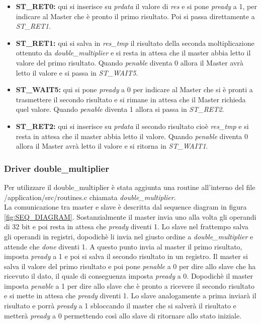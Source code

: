 \documentclass[]{IEEEtran}
\begin{document}
\begin{itemize}
    \item \textbf{ST\_RET0:} qui si inserisce su \textit{prdata} il valore di \textit{res} e si pone \textit{pready} a 1, per indicare al Master che è pronto il primo risultato. Poi si passa direttamente a \textit{ST\_RET1}.
    \item \textbf{ST\_RET1:} qui si salva in \textit{res\_tmp} il risultato della seconda moltiplicazione ottenuto da \textit{double\_multiplier} e si resta in attesa che il master abbia letto il valore del primo risultato. Quando \textit{penable} diventa 0 allora il Master avrà letto il valore e si passa in \textit{ST\_WAIT5}.
    \item \textbf{ST\_WAIT5:} qui si pone \textit{pready} a 0 per indicare al Master che si è pronti a trasmettere il secondo risultato e si rimane in attesa che il Master richieda quel valore. Quando \textit{penable} diventa 1 allora si passa in \textit{ST\_RET2}.
    \item \textbf{ST\_RET2:} qui si inserisce su \textit{prdata} il secondo risultato cioè \textit{res\_tmp} e si resta in attesa che il master abbia letto il valore. Quando \textit{penable} diventa 0 allora il Master avrà letto il valore e si ritorna in \textit{ST\_WAIT1}.
\end{itemize}

\subsubsection{Driver double\_multiplier}
Per utilizzare il double\_multiplier è stata aggiunta una routine all'interno del file /application/src/routines.c chiamata \textit{double\_multiplier}.
\\La comunicazione tra master e slave è descritta dal sequence diagram in figura \ref{fig:SEQ_DIAGRAM}. Sostanzialmente il master invia uno alla volta gli operandi di 32 bit e poi resta in attesa che \textit{pready} diventi 1. Lo slave nel frattempo salva gli operandi in registri, dopodichè li invia nel giusto ordine a \textit{double\_multiplier} e attende che \textit{done} diventi 1. A questo punto invia al master il primo risultato, imposta \textit{pready} a 1 e poi si salva il secondo risultato in un registro. Il master si salva il valore del primo risultato e poi pone \textit{penable} a 0 per dire allo slave che ha ricevuto il dato, il quale di conseguenza imposta \textit{pready} a 0. Dopodichè il master imposta \textit{penable} a 1 per dire allo slave che è pronto a ricevere il secondo risultato e si mette in attesa che \textit{pready} diventi 1. Lo slave analogamente a prima inviarà il risultato e porrà \textit{pready} a 1 sbloccando il master che si salverà il risultato e metterà \textit{pready} a 0 permettendo così allo slave di ritornare allo stato iniziale.
\end{document}

